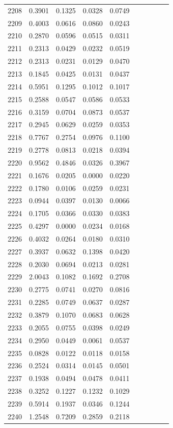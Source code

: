 \begin{table}
\begin{tabular}{cccccccccc}
2208& 0.3901& 0.1325& 0.0328& 0.0749\\ 
2209& 0.4003& 0.0616& 0.0860& 0.0243\\ 
2210& 0.2870& 0.0596& 0.0515& 0.0311\\ 
2211& 0.2313& 0.0429& 0.0232& 0.0519\\ 
2212& 0.2313& 0.0231& 0.0129& 0.0470\\ 
2213& 0.1845& 0.0425& 0.0131& 0.0437\\ 
2214& 0.5951& 0.1295& 0.1012& 0.1017\\ 
2215& 0.2588& 0.0547& 0.0586& 0.0533\\ 
2216& 0.3159& 0.0704& 0.0873& 0.0537\\ 
2217& 0.2945& 0.0629& 0.0259& 0.0353\\ 
2218& 0.7767& 0.2754& 0.0976& 0.1100\\ 
2219& 0.2778& 0.0813& 0.0218& 0.0394\\ 
2220& 0.9562& 0.4846& 0.0326& 0.3967\\ 
2221& 0.1676& 0.0205& 0.0000& 0.0220\\ 
2222& 0.1780& 0.0106& 0.0259& 0.0231\\ 
2223& 0.0944& 0.0397& 0.0130& 0.0066\\ 
2224& 0.1705& 0.0366& 0.0330& 0.0383\\ 
2225& 0.4297& 0.0000& 0.0234& 0.0168\\ 
2226& 0.4032& 0.0264& 0.0180& 0.0310\\ 
2227& 0.3937& 0.0632& 0.1398& 0.0420\\ 
2228& 0.2030& 0.0694& 0.0213& 0.0281\\ 
2229& 2.0043& 0.1082& 0.1692& 0.2708\\ 
2230& 0.2775& 0.0741& 0.0270& 0.0816\\ 
2231& 0.2285& 0.0749& 0.0637& 0.0287\\ 
2232& 0.3879& 0.1070& 0.0683& 0.0628\\ 
2233& 0.2055& 0.0755& 0.0398& 0.0249\\ 
2234& 0.2950& 0.0449& 0.0061& 0.0537\\ 
2235& 0.0828& 0.0122& 0.0118& 0.0158\\ 
2236& 0.2524& 0.0314& 0.0145& 0.0501\\ 
2237& 0.1938& 0.0494& 0.0478& 0.0411\\ 
2238& 0.3252& 0.1227& 0.1232& 0.1029\\ 
2239& 0.5914& 0.1937& 0.0346& 0.1244\\ 
2240& 1.2548& 0.7209& 0.2859& 0.2118\\ 

\end{tabular}
\end{table}
